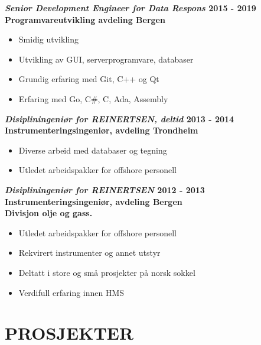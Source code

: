 \documentclass[margin, 10pt, norsk]{res} %
\begin{document}
\begin{resume}
\textbf{\emph{Senior Development Engineer for Data Respons} \hfill 2015 - 2019\\
Programvareutvikling avdeling Bergen}

\begin{itemize} \itemsep -2pt %
\item Smidig utvikling
\item Utvikling av GUI, serverprogramvare, databaser
\item Grundig erfaring med Git, C++ og Qt
\item Erfaring med Go, C\#, C, Ada, Assembly
\end{itemize}

\textbf{\emph{Disipliningeniør for REINERTSEN, deltid} \hfill 2013 - 2014\\
Instrumenteringsingeniør, avdeling Trondheim}

\begin{itemize} \itemsep -2pt %
\item Diverse arbeid med databaser og tegning
\item Utledet arbeidspakker for offshore personell 
\end{itemize}

\textbf{\emph{Disipliningeniør for REINERTSEN} \hfill 2012 - 2013 \\
Instrumenteringsingeniør, avdeling Bergen\\
Divisjon olje og gass.}
\begin{itemize} \itemsep -2pt %
\item Utledet arbeidspakker for offshore personell 
\item Rekvirert instrumenter og annet utstyr
\item Deltatt i store og små prosjekter på norsk sokkel
\item Verdifull erfaring innen HMS
\end{itemize}

\newpage

\hspace{5mm} 

\section{PROSJEKTER}


\end{resume}
\end{document}
